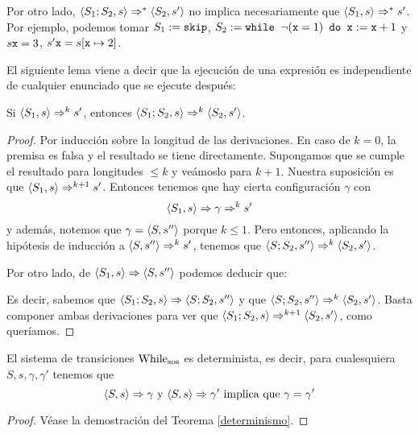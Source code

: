 \begin{example}
Por otro lado, $\la{S_1;S_2}{s}\dto^* \la{S_2}{s'}$ no implica necesariamente que $\la{S_1}{s}\dto^* s'$. Por ejemplo, podemos tomar $S_1 := \n{skip}$, $S_2 := \n{while }\neg(\n{x}=1)\n{ do } \n{x}:=\n{x}+1$ y $s\n{x} = 3$, $s'\n{x} = s[\n{x}\mapsto 2]$.
\end{example}


El siguiente lema viene a decir que la ejecución de una expresión es independiente de cualquier enunciado que se ejecute después:

\begin{lema}\label{lemasos2}
Si $\la{S_1}{s}\dto^k s'$, entonces $\la{S_1;S_2}{s}\dto^k \la{S_2}{s'}$.
\end{lema}
\begin{proof}
Por inducción sobre la longitud de las derivaciones. En caso de $k=0$, la premisa es falsa y el resultado se tiene directamente. Supongamos que se cumple el resultado para longitudes $\leq k$ y veámoslo para $k+1$. Nuestra suposición es que $\la{S_1}{s}\dto^{k+1} s'$. Entonces tenemos que hay cierta configuración $\gamma$ con 
$$\la{S_1}{s}\dto \gamma \dto^k s'$$
y además, notemos que $\gamma = \la{S}{s''}$ porque $k\leq 1$. Pero entonces, aplicando la hipótesis de inducción a $\la{S}{s''} \dto^k s'$, tenemos que $\la{S;S_2}{s''}\dto^k \la{S_2}{s'}$. 

Por otro lado, de $\la{S_1}{s}\dto \la{S}{s''}$ podemos deducir que:
\begin{prooftree}
\end{prooftree}
Es decir, sabemos que $\la{S_1; S_2}{s} \dto \la{S; S_2}{s''}$ y que $\la{S;S_2}{s''}\dto^k \la{S_2}{s'}$. Basta componer ambas derivaciones para ver que $\la{S_1; S_2}{s}\dto^{k+1} \la{S_2}{s'}$, como queríamos.
\end{proof}

\begin{theorem}
El sistema de transiciones $\nn{While}_\nn{sos}$ es determinista, es decir, para cualesquiera $S, s, \gamma, \gamma'$ tenemos que
$$\la{S}{s}\dto \gamma \text{ y } \la{S}{s}\dto \gamma' \text{ implica que } \gamma = \gamma'$$
\end{theorem}
\begin{proof}
Véase la demostración del Teorema \ref{determinismo}.
\end{proof}

